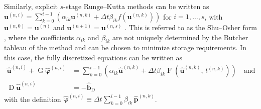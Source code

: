 \documentclass[gmd, manuscript]{copernicus}
\begin{document}
Similarly, explicit \(s\)-stage Runge--Kutta methods can be written as \(\boldsymbol{u}^{(n,i)} = \sum_{k=0}^{i-1} \left( \alpha_{ik} \boldsymbol{u}^{(n,k)} + \Delta t \beta_{ik} f(\boldsymbol{u}^{(n,k)}) \right)\) for \(i=1,\dots,s\), with \(\boldsymbol{u}^{(n,0)} = \boldsymbol{u}^{(n)}\) and \(\boldsymbol{u}^{(n+1)} = \boldsymbol{u}^{(n,s)}\) \citep{GottliebKetchesonShu2009}.
This is referred to as the Shu--Osher form \citep{ShuOsher1988}, where the coefficients \(\alpha_{ik}\) and \(\beta_{ik}\) are not uniquely determined by the Butcher tableau of the method and can be chosen to minimize storage requirements.
In this case, the fully discretized equations can be written as
\begin{equation}
  \begin{aligned}
  \boldsymbol{\hat{u}}^{(n,i)} + \operatorname{G} \boldsymbol{\hat{\varphi}}^{(n,i)} &=
  \sum_{k=0}^{i-1} \left( \alpha_{ik} \boldsymbol{\hat{u}}^{(n,k)} + \Delta t \beta_{ik} \operatorname{F}\left(\boldsymbol{\hat{u}}^{(n,k)},\, t^{(n,k)}\right) \right)
  \quad\text{and} \\
  \operatorname{D} \boldsymbol{\hat{u}}^{(n,i)} &= - \boldsymbol{\hat{b}}_{\operatorname{D}}
  \end{aligned}
\end{equation}
with the definition \(\boldsymbol{\hat{\varphi}}^{(n,i)} \equiv \Delta t \sum_{k=0}^{i-1} \beta_{ik}\, \boldsymbol{\hat{p}}^{(n,k)}\).
\end{document}

